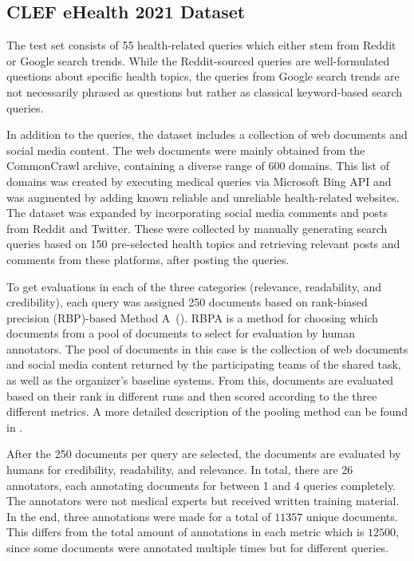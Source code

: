 \subsection{CLEF eHealth 2021 Dataset}
The test set consists of 55 health-related queries which either stem from Reddit or Google search trends.
While the Reddit-sourced queries are well-formulated questions about specific health topics, the queries from Google search trends are not necessarily phrased as questions but rather as classical keyword-based search queries.

In addition to the queries, the dataset includes a collection of web documents and social media content.
The web documents were mainly obtained from the CommonCrawl archive, containing a diverse range of 600 domains.
This list of domains was created by executing medical queries via Microsoft Bing API and was augmented by adding known reliable and unreliable health-related websites.
The dataset was expanded by incorporating social media comments and posts from Reddit and Twitter.
These were collected by manually generating search queries based on 150 pre-selected health topics and retrieving relevant posts and comments from these platforms, after posting the queries.

To get evaluations in each of the three categories (relevance, readability, and credibility), each query was assigned 250 documents based on rank-biased precision (RBP)-based Method A~(\cite{moffat:2008:Rank}).
RBPA is a method for choosing which documents from a pool of documents to select for evaluation by human annotators.
The pool of documents in this case is the collection of web documents and social media content returned by the participating teams of the shared task, as well as the organizer's baseline systems.
From this, documents are evaluated based on their rank in different runs and then scored according to the three different metrics.
A more detailed description of the pooling method can be found in \cite{lipani:2017:Fixed}.

After the 250 documents per query are selected, the documents are evaluated by humans for credibility, readability, and relevance.
In total, there are 26 annotators, each annotating documents for between 1 and 4 queries completely.
The annotators were not medical experts but received written training material.
In the end, three annotations were made for a total of $11 357$ unique documents.
This differs from the total amount of annotations in each metric which is $12 500$, since some documents were annotated multiple times but for different queries.

